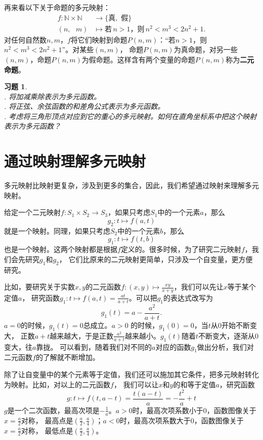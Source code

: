 \documentclass[12pt,UTF8]{ctexbook}
\newtheorem{xt}{习题}[section]
\begin{document}
再来看以下关于命题的多元映射：
\begin{align*}
    f: \mathbb{N} \times \mathbb{N} \,\, &\rightarrow \{\mbox{真}, \,\, \mbox{假}\}  \\
    (n, \,\,\,\, m) &\mapsto \mbox{若}\, n > 1 \mbox{，则}\, n^2 < m^3 < 2n^2 + 1.  
\end{align*}
对任何自然数$n,m$，$f$将它们映射到命题$P(n,m)$：“若$n > 1$，则$n^2 < m^3 < 2n^2 + 1$”。对某些$(n,m)$，
命题$P(n,m)$为真命题，对另一些$(n,m)$，命题$P(n,m)$为假命题。这样含有两个变量的命题$P(n,m)$称为\textbf{二元命题}。

\begin{xt}
    \mbox{} \\
    . 将加减乘除表示为多元函数。\\
    . 将正弦、余弦函数的和差角公式表示为多元函数。\\
    . 考虑将三角形顶点对应到它的重心的多元映射。如何在直角坐标系中把这个映射表示为多元函数？
\end{xt}

\section{通过映射理解多元映射}

多元映射比映射更复杂，涉及到更多的集合，因此，我们希望通过映射来理解多元映射。

给定一个二元映射$f:S_1 \times S_2 \rightarrow S_3$，如果只考虑$S_1$中的一个元素$a$，那么
$$ g_2: t \mapsto f(a, t)$$
就是一个映射。同理，如果只考虑$S_2$中的一个元素$b$，那么
$$g_1 : t \mapsto f(t, b)$$
也是一个映射。这两个映射都是根据$f$定义的。很多时候，为了研究二元映射$f$，我们会先研究$g_1$和$g_2$，
它们比原来的二元映射更简单，只涉及一个自变量，更方便研究。

比如，要研究关于实数$x, y$的二元函数$f: (x, y) \mapsto \frac{xy}{x + y}$，我们可以先让$x$等于某个定值$a$，
研究函数$g_1 : t \mapsto f(a, t) = \frac{at}{a + t}$。可以把$g_1$的表达式改写为
$$ g_1(t) = a - \frac{a^2}{a + t}.$$
$a = 0$的时候，$g_1(t) = 0$总成立。$a > 0$ 的时候，$g_1(0) = 0$，当$t$从$0$开始不断变大，
正数$a + t$越来越大，于是正数$\frac{a^2}{a + t}$越来越小。$g_1(t)$随着$t$不断变大，逐渐从$0$变大，往$a$靠拢。
可以看到，随着我们对不同的$a$对应的函数$g_1$做出分析，我们对二元函数$f$的了解就不断增加。

除了让自变量中的某个元素等于定值，我们还可以施加其它条件，把多元映射转化为映射。比如，对以上的二元函数$f$，
我们可以让$x$和$y$的和等于定值$a$，研究函数
$$ g : t \mapsto f(t, a - t) = \frac{t(a - t)}{a} = -\frac{t^2}{a} + t$$
$g$是一个二次函数，最高次项是$-\frac{1}{a}$。$a>0$时，最高次项系数小于$0$，函数图像关于$x = \frac{a}{2}$对称，
最高点是$(\frac{a}{2}, \frac{a}{4})$；$a<0$时，最高次项系数大于$0$，函数图像关于$x = \frac{a}{2}$对称，
最低点是$(\frac{a}{2}, \frac{a}{4})$。
\end{document}
